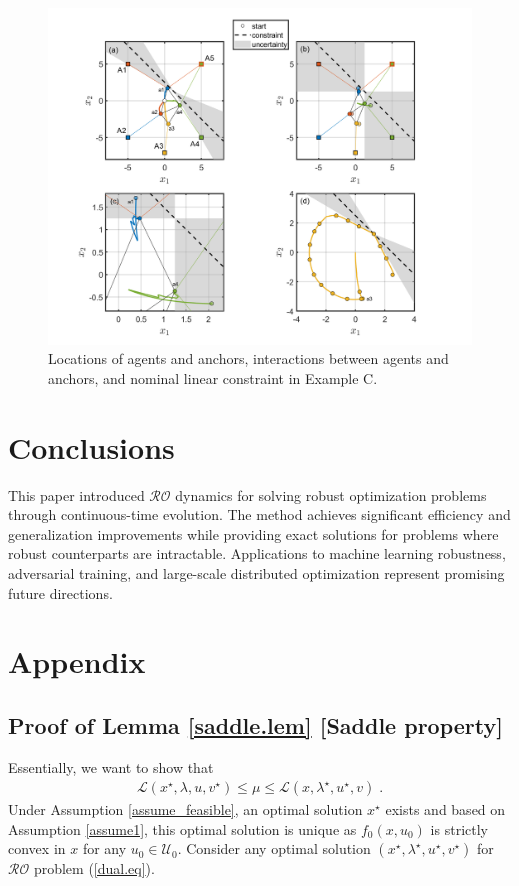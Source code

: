 \documentclass[journal,twoside,web]{ieeecolor}
\newcommand{\rev}[1]{\textcolor{revisionblue}{#1}}
\begin{document}
\begin{figure}
\begin{center}
\includegraphics[scale=0.26]{simulation_figure_finalv3.png}
\vspace{-1.5mm}
\caption{\rev{Locations of agents and anchors, interactions between agents and anchors, and nominal linear constraint in Example C.}}
\label{fig_points}
\end{center}
\end{figure}

\section{Conclusions}\label{section_conclusions}


\rev{This paper introduced $\mathcal{RO}$ dynamics for solving robust optimization problems through continuous-time evolution. The method achieves significant efficiency and generalization improvements while providing exact solutions for problems where robust counterparts are intractable. Applications to machine learning robustness, adversarial training, and large-scale distributed optimization represent promising future directions.}
\section{Appendix} \label{section_appendix}

\subsection*{\rev{Proof of Lemma \ref{saddle.lem} [Saddle property]}}
Essentially, we want to show that
\begin{align*}
\mathcal{L}(x^\star,\lambda,u,v^\star)\leq \mu \leq \mathcal{L}(x,\lambda^\star,u^\star,v)\;.
\end{align*}
Under Assumption \ref{assume_feasible}, an optimal solution $x^\star$ exists and based on Assumption \ref{assume1}, this optimal solution is unique as $f_0(x,u_0)$ is strictly convex in $x$ for any $u_0 \in\mathcal{U}_0$. Consider any optimal solution $(x^\star,\lambda^\star,u^\star,v^\star)$ for $\mathcal{RO}$ problem (\ref{dual.eq}).
\end{document}
